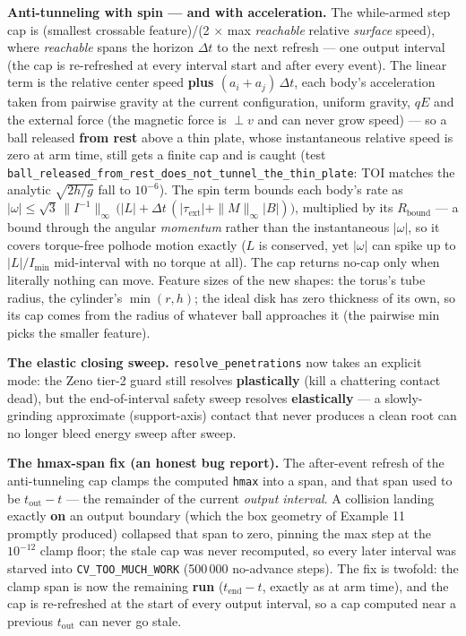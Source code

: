 \documentclass[11pt]{article}
\newcommand{\code}[1]{\texttt{#1}}
\begin{document}
\textbf{Anti-tunneling with spin --- and with acceleration.} The
while-armed step cap is (smallest crossable feature)/(2 $\times$ max
\emph{reachable} relative \emph{surface} speed), where \emph{reachable}
spans the horizon $\Delta t$ to the next refresh --- one output interval
(the cap is re-refreshed at every interval start and after every event).
The linear term is the relative center speed \textbf{plus
$(a_i + a_j)\,\Delta t$}, each body's acceleration taken from pairwise
gravity at the current configuration, uniform gravity, $qE$ and the
external force (the magnetic force is $\perp v$ and can never grow speed)
--- so a ball released \textbf{from rest} above a thin plate, whose
instantaneous relative speed is zero at arm time, still gets a finite cap
and is caught (test
\code{ball\_released\_from\_rest\_does\_not\_tunnel\_the\_thin\_plate}:
TOI matches the analytic $\sqrt{2h/g}$ fall to $10^{-6}$). The spin term
bounds each body's rate as
$|\omega| \le \sqrt3\,\|I^{-1}\|_\infty\,\bigl(|L| + \Delta t\,(|\tau_{\mathrm{ext}}|
+ \|M\|_\infty |B|)\bigr)$, multiplied by its $R_{\mathrm{bound}}$ --- a
bound through the angular \emph{momentum} rather than the instantaneous
$|\omega|$, so it covers torque-free polhode motion exactly ($L$ is
conserved, yet $|\omega|$ can spike up to $|L|/I_{\min}$ mid-interval with
no torque at all). The cap returns no-cap only when literally nothing can
move. Feature sizes of the new shapes: the torus's tube radius, the
cylinder's $\min(r, h)$; the ideal disk has zero thickness of its own, so
its cap comes from the radius of whatever ball approaches it (the pairwise
min picks the smaller feature).

\textbf{The elastic closing sweep.} \code{resolve\_penetrations} now takes an
explicit mode: the Zeno tier-2 guard still resolves \textbf{plastically}
(kill a chattering contact dead), but the end-of-interval safety sweep
resolves \textbf{elastically} --- a slowly-grinding approximate
(support-axis) contact that never produces a clean root can no longer bleed
energy sweep after sweep.

\textbf{The hmax-span fix (an honest bug report).} The after-event refresh of
the anti-tunneling cap clamps the computed \code{hmax} into a span, and that
span used to be $t_{\mathrm{out}} - t$ --- the remainder of the current
\emph{output interval}. A collision landing exactly \textbf{on} an output
boundary (which the box geometry of Example 11 promptly produced) collapsed
that span to zero, pinning the max step at the $10^{-12}$ clamp floor; the
stale cap was never recomputed, so every later interval was starved into
\code{CV\_TOO\_MUCH\_WORK} (500\,000 no-advance steps). The fix is twofold:
the clamp span is now the remaining \textbf{run} ($t_{\mathrm{end}} - t$,
exactly as at arm time), and the cap is re-refreshed at the start of every
output interval, so a cap computed near a previous $t_{\mathrm{out}}$ can
never go stale.
\end{document}
